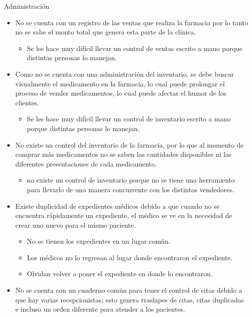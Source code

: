 Administración

\begin{itemize}
	\item No se cuenta con un registro de las ventas que realiza la farmacia por lo tanto no se sabe el monto total que genera esta parte de la clínica.
	\begin{itemize}
		\item Se les hace muy difícil llevar un control de ventas escrito a mano porque distintas personas lo manejan.
	\end{itemize}
    
    \item Como no se cuenta con una administración del inventario, se debe buscar visualmente el medicamento en la farmacia, lo cual puede prolongar el proceso de vender medicamentos, lo cual puede afectar el humor de los clientes.

	\begin{itemize}
		\item Se les hace muy difícil llevar un control de inventario escrito a mano porque distintas personas lo manejan.
	\end{itemize}
    
    \item No existe un control del inventario de la farmacia, por lo que al momento de comprar más medicamentos no se saben las cantidades disponibles ni las diferentes presentaciones de cada medicamento.

	\begin{itemize}
		\item no existe un control de inventario porque no se tiene una herramiento para llevarlo de una manera  concurrente con los distintos vendedores. 
	\end{itemize}
    
    \item Existe duplicidad de expedientes médicos debido a que cuando no se encuentra rápidamente un expediente, el médico se ve en la necesidad de crear uno nuevo para el mismo paciente. 
	\begin{itemize}
		\item No se tienen los expedientes en un lugar común.
        \item Los médicos no lo regresan al lugar donde encontraron el expediente.
		\item Olvidan volver a poner el expediente en donde lo encontraron.
	\end{itemize}
    
    \item No se cuenta con un  cuaderno común para tener el control de citas debido a que hay varias recepcionistas; esto genera traslapes de citas, citas duplicadas e incluso un orden diferente para atender a los pacientes.


\end{itemize}
